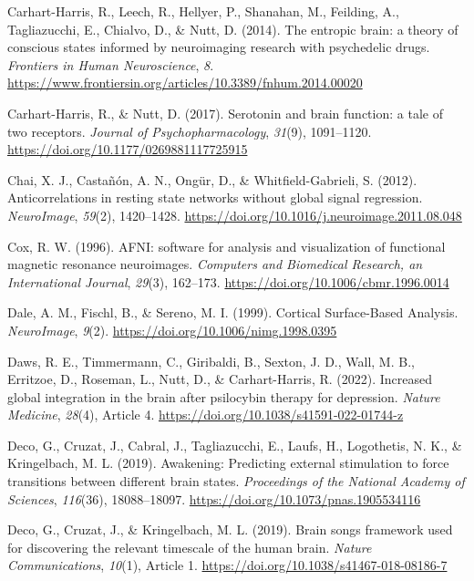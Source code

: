 \begin{CSLReferences}{1}{0}
Carhart-Harris, R., Leech, R., Hellyer, P., Shanahan, M., Feilding, A.,
Tagliazucchi, E., Chialvo, D., \& Nutt, D. (2014). The entropic brain: a
theory of conscious states informed by neuroimaging research with
psychedelic drugs. \emph{Frontiers in Human Neuroscience}, \emph{8}.
\url{https://www.frontiersin.org/articles/10.3389/fnhum.2014.00020}

Carhart-Harris, R., \& Nutt, D. (2017). Serotonin and brain function: a
tale of two receptors. \emph{Journal of Psychopharmacology},
\emph{31}(9), 1091--1120. \url{https://doi.org/10.1177/0269881117725915}

Chai, X. J., Castañón, A. N., Ongür, D., \& Whitfield-Gabrieli, S.
(2012). Anticorrelations in resting state networks without global signal
regression. \emph{NeuroImage}, \emph{59}(2), 1420--1428.
\url{https://doi.org/10.1016/j.neuroimage.2011.08.048}

Cox, R. W. (1996). AFNI: software for analysis and visualization of
functional magnetic resonance neuroimages. \emph{Computers and
Biomedical Research, an International Journal}, \emph{29}(3), 162--173.
\url{https://doi.org/10.1006/cbmr.1996.0014}

Dale, A. M., Fischl, B., \& Sereno, M. I. (1999). Cortical Surface-Based
Analysis. \emph{NeuroImage}, \emph{9}(2).
\url{https://doi.org/10.1006/nimg.1998.0395}

Daws, R. E., Timmermann, C., Giribaldi, B., Sexton, J. D., Wall, M. B.,
Erritzoe, D., Roseman, L., Nutt, D., \& Carhart-Harris, R. (2022).
Increased global integration in the brain after psilocybin therapy for
depression. \emph{Nature Medicine}, \emph{28}(4), Article 4.
\url{https://doi.org/10.1038/s41591-022-01744-z}

Deco, G., Cruzat, J., Cabral, J., Tagliazucchi, E., Laufs, H.,
Logothetis, N. K., \& Kringelbach, M. L. (2019). Awakening: Predicting
external stimulation to force transitions between different brain
states. \emph{Proceedings of the National Academy of Sciences},
\emph{116}(36), 18088--18097.
\url{https://doi.org/10.1073/pnas.1905534116}

Deco, G., Cruzat, J., \& Kringelbach, M. L. (2019). Brain songs
framework used for discovering the relevant timescale of the human
brain. \emph{Nature Communications}, \emph{10}(1), Article 1.
\url{https://doi.org/10.1038/s41467-018-08186-7}


\end{CSLReferences}
